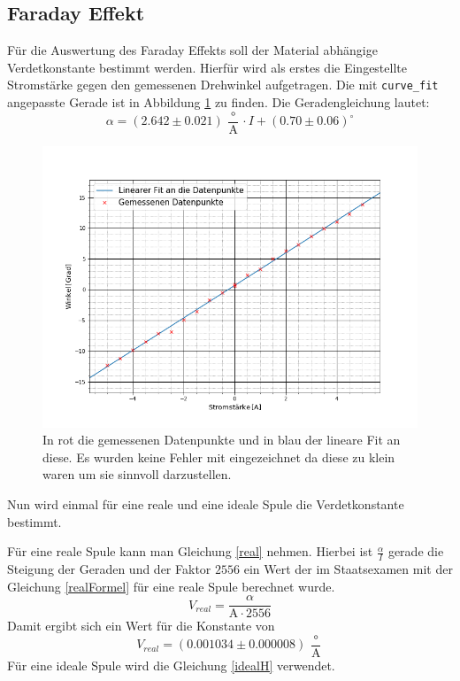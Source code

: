 \subsection{Faraday Effekt}
Für die Auswertung des Faraday Effekts soll der Material abhängige Verdetkonstante bestimmt werden. Hierfür wird als erstes die Eingestellte Stromstärke gegen den gemessenen Drehwinkel aufgetragen. Die mit \verb|curve_fit| angepasste Gerade ist in Abbildung \ref{Dreh} zu finden. Die Geradengleichung lautet:
$$\alpha=(2.642\pm0.021)\,\frac{\circ}{\text{A}}\cdot I + (0.70\pm0.06)^\circ$$
\begin{figure}[ht]
	\includegraphics[scale=0.5]{Bild/V2Lin}
	\centering
	\caption[Datenpunkte und Fit der Faraday Messung]{\small In rot die gemessenen Datenpunkte und in blau der lineare Fit an diese. Es wurden keine Fehler mit eingezeichnet da diese zu klein waren um sie sinnvoll darzustellen.}
	\label{Dreh}
\end{figure}
Nun wird einmal für eine reale und eine ideale Spule die Verdetkonstante bestimmt.\par
Für eine reale Spule kann man Gleichung \ref{real} nehmen. Hierbei ist $\frac{\alpha}{I}$ gerade die Steigung der Geraden und der Faktor $2556$ ein Wert der im Staatsexamen\cite{staatsex_farpock} mit der Gleichung \ref{realFormel} für eine reale Spule berechnet wurde.
\begin{equation}
	V_{real}=\frac{\alpha}{\text{A}\cdot 2556}
	\label{real}
\end{equation}
Damit ergibt sich ein Wert für die Konstante von $$V_{real}=(0.001034 \pm 0.000008)\,\frac{\circ}{\text{A}}$$
Für eine ideale Spule wird die Gleichung \ref{idealH} verwendet.
